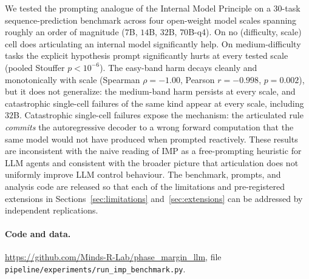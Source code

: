\documentclass[11pt]{article}
\begin{document}
We tested the prompting analogue of the Internal Model Principle
on a $30$-task sequence-prediction benchmark across four
open-weight model scales spanning roughly an order of magnitude
($7$B, $14$B, $32$B, $70$B-q4).  On no (difficulty, scale) cell
does articulating an internal model significantly help.  On
medium-difficulty tasks the explicit hypothesis prompt
significantly hurts at every tested scale (pooled Stouffer
$p < 10^{-6}$).  The easy-band harm decays cleanly and
monotonically with scale (Spearman $\rho = -1.00$,
Pearson $r = -0.998$, $p = 0.002$), but it does not generalize:
the medium-band harm persists at every scale, and catastrophic
single-cell failures of the same kind appear at every scale,
including $32$B.  Catastrophic single-cell failures expose the
mechanism: the articulated rule \emph{commits} the autoregressive
decoder to a wrong forward computation that the same model would
not have produced when prompted reactively.  These results are
inconsistent with the naive reading of IMP as a free-prompting
heuristic for LLM agents and consistent with the broader picture
that articulation does not uniformly improve LLM control behaviour.
The benchmark, prompts, and analysis code are released so that
each of the limitations and pre-registered extensions in
Sections~\ref{sec:limitations} and~\ref{sec:extensions} can be
addressed by independent replications.

\paragraph{Code and data.}
\url{https://github.com/Minds-R-Lab/phase_margin_llm}, file
\verb|pipeline/experiments/run_imp_benchmark.py|.
\end{document}
